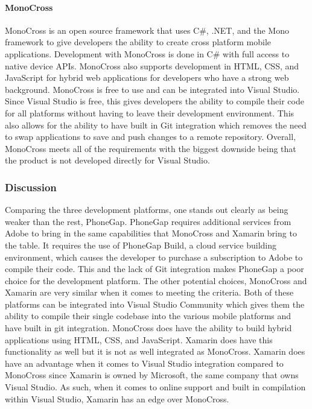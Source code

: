 \documentclass[onecolumn, draftclsnofoot,10pt, compsoc]{IEEEtran}
\begin{document}
\paragraph{MonoCross}

MonoCross is an open source framework that uses C\#, .NET, and the Mono framework to give developers the ability to create cross platform mobile applications. Development with MonoCross is
done in C\# with full access to native device APIs. MonoCross also supports development in HTML, CSS, and JavaScript for hybrid web applications for developers who have a strong web background.
MonoCross is free to use and can be integrated into Visual Studio.
Since Visual Studio is free, this gives developers the ability to compile their code for all platforms without having to leave their development environment. This also allows for the ability to have built in Git
integration which removes the need to swap applications to save and push changes to a remote repository. Overall, MonoCross meets all of the requirements with the biggest downside being that the product
is not developed directly for Visual Studio.

\subsubsection{Discussion}

Comparing the three development platforms, one stands out clearly as being weaker than the rest, PhoneGap. 
PhoneGap requires additional services from Adobe to bring in the same capabilities that MonoCross and Xamarin bring to the table. It requires the use of PhoneGap Build, a cloud service building environment,
which causes the developer to purchase a subscription to Adobe to compile their code. This and the lack of Git integration makes PhoneGap a poor choice for the development platform.
The other potential choices, MonoCross and Xamarin are very similar when it comes to meeting the criteria. Both of these platforms can be integrated into Visual Studio Community which gives them 
the ability to compile their single codebase into the various mobile platforms and have built in git integration. MonoCross does have the ability to build hybrid applications using HTML, CSS, and JavaScript. Xamarin
does have this functionality as well but it is not as well integrated as MonoCross. Xamarin does have an advantage when it comes to Visual Studio integration compared to MonoCross since Xamarin is owned by Microsoft, the same
company that owns Visual Studio. As such, when it comes to online support and built in compilation within Visual Studio, Xamarin has an edge over MonoCross.
\end{document}
